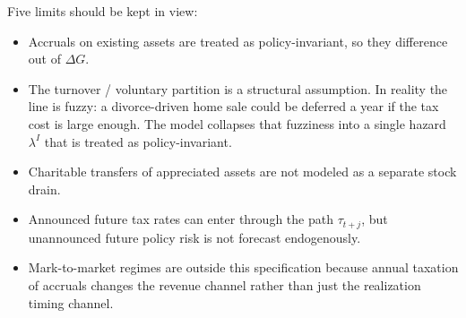\documentclass[11pt]{article}
\newcommand{\dG}{\Delta G}
\begin{document}
Five limits should be kept in view:

\begin{itemize}
  \item Accruals on existing assets are treated as policy-invariant, so they
        difference out of $\dG$.
  \item The turnover / voluntary partition is a structural assumption.
        In reality the line is fuzzy: a divorce-driven home sale could be
        deferred a year if the tax cost is large enough. The model
        collapses that fuzziness into a single hazard $\lambda^I$ that
        is treated as policy-invariant.
  \item Charitable transfers of appreciated assets are not modeled as a
        separate stock drain.
  \item Announced future tax rates can enter through the path
        $\tau_{t+j}$, but unannounced future policy risk is not forecast
        endogenously.
  \item Mark-to-market regimes are outside this specification because annual
        taxation of accruals changes the revenue channel rather than just the
        realization timing channel.
\end{itemize}
\end{document}
